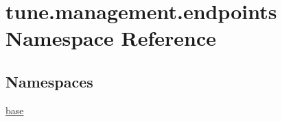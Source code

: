 \hypertarget{namespacetune_1_1management_1_1endpoints}{\section{tune.\-management.\-endpoints Namespace Reference}
\label{namespacetune_1_1management_1_1endpoints}
}
\subsection*{Namespaces}
\begin{DoxyCompactItemize}
\item 
\hyperlink{namespacetune_1_1management_1_1endpoints_1_1base}{base}
\end{DoxyCompactItemize}
